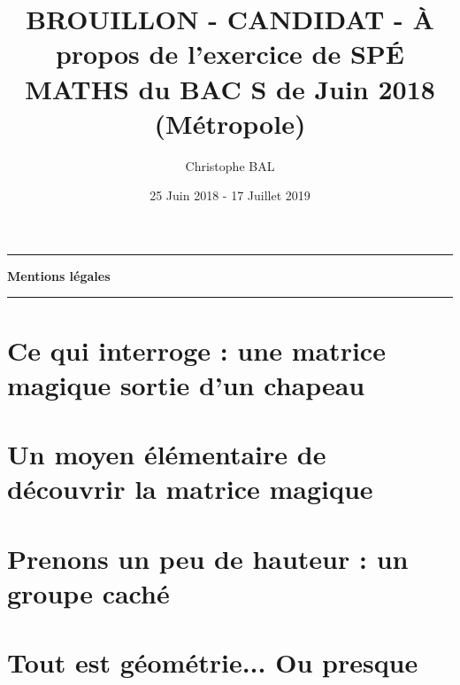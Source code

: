 \documentclass[12pt]{amsart}
\newcommand\squote[1]{\og #1 \fg{}}
\begin{document}
\title{BROUILLON - CANDIDAT - À propos de l'exercice de SPÉ MATHS du BAC S de Juin 2018 (Métropole)}
\author{Christophe BAL}
\date{25 Juin 2018 - 17 Juillet 2019}
\maketitle


\begin{center}
	\hrule\vspace{.3em}
	{
		\fontsize{1.35em}{1em}\selectfont
		\textbf{Mentions \og légales \fg}
	}
			
	\vspace{0.45em}
	\doclicenseThis
	\hrule
\end{center}



\setcounter{tocdepth}{2}
\tableofcontents



\section{Ce qui interroge : une matrice \squote{magique} sortie d'un chapeau}





\section{Un moyen élémentaire de découvrir la matrice \squote{magique}}





\section{Prenons un peu de hauteur : un groupe \squote{caché}}





\section{Tout est géométrie... Ou presque}


\end{document}
